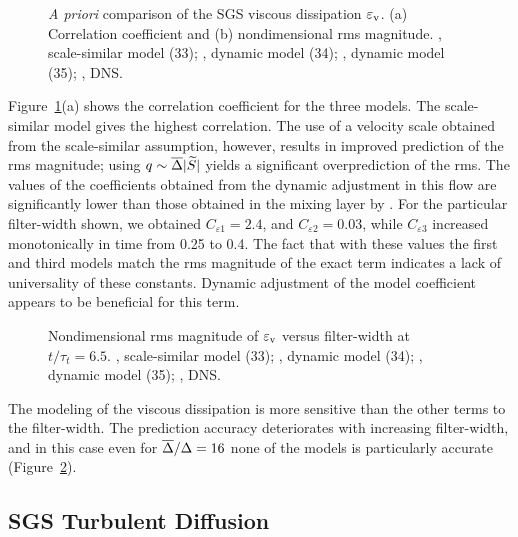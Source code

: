 \documentclass[tcfd]{svjour}
\begin{document}
\begin{figure}[t]
\vspace{85mm}%
\caption{{\it A priori} comparison of the SGS viscous dissipation
$\varepsilon_{\rm v}$. (a) Correlation coeff\/icient and (b) nondimensional rms magnitude.
\solid, scale-similar model (33); \dashed, dynamic model (34); \chndot, dynamic model (35);
\trian, DNS.}
\label{fig:fig08}
\end{figure}

Figure~\ref{fig:fig08}(a) shows the correlation coeff\/icient for the three models.
The scale-similar model gives the highest correlation. The use of a
velocity scale obtained from the scale-similar assumption, however,
results in improved prediction of the rms magnitude; using
$q\sim\overline{\Delta}|\widetilde{S}|$ yields a signif\/icant overprediction of the rms.
The values of the coeff\/icients obtained from the dynamic adjustment in
this f\/low are signif\/icantly lower than those obtained in the mixing
layer by \citet{vre95b}. For the particular
f\/ilter-width shown, we obtained $C_{\varepsilon 1}=2.4$, and $C_{\varepsilon
 2}=0.03$, while $C_{\varepsilon3}$ increased monotonically in time from
0.25 to 0.4. The fact that with these values the f\/irst and third
models match the rms magnitude of the exact term indicates a lack of
universality of these constants. Dynamic adjustment of the model
coeff\/icient appears to be benef\/icial for this term.

\begin{figure}[t]
\vspace{45mm}%
\caption{Nondimensional rms magnitude of $\varepsilon_{\rm v}$
versus f\/ilter-width at $t/\tau_t=6.5$. \solid, scale-similar model (33); \dashed, dynamic
model (34); \chndot, dynamic model (35); \trian, DNS.}
\label{fig:fig09}
\end{figure}

The modeling of the viscous dissipation is more sensitive than the
other terms to the f\/ilter-width. The prediction accuracy deteriorates
with increasing f\/ilter-width, and in this case even for
$\overline{\Delta}/\Delta=16$ none of the models is particularly accurate
(Figure~\ref{fig:fig09}).
\pagebreak


\subsection{SGS Turbulent Diffusion}
\label{sec:5.3}
\end{document}
